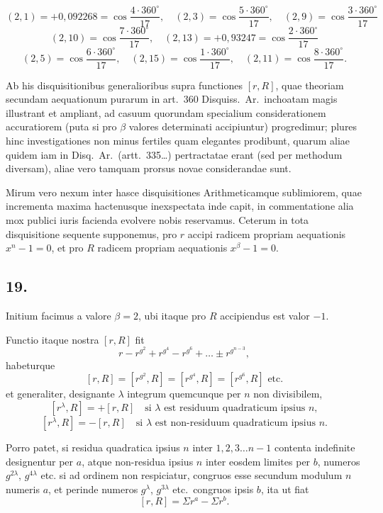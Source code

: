\documentclass[12pt,a4paper]{article}
\begin{document}
\[
(2,1) = +0{,}092268 = \cos\frac{4\cdot 360^\circ}{17}, \quad (2,3) = \cos\frac{5\cdot 360^\circ}{17}, \quad (2,9) = \cos\frac{3\cdot 360^\circ}{17}
\]
\[
(2,10) = \cos\frac{7\cdot 360^\circ}{17}, \quad (2,13) = +0{,}93247 = \cos\frac{2\cdot 360^\circ}{17}
\]
\[
(2,5) = \cos\frac{6\cdot 360^\circ}{17}, \quad (2,15) = \cos\frac{1\cdot 360^\circ}{17}, \quad (2,11) = \cos\frac{8\cdot 360^\circ}{17}.
\]

Ab his disquisitionibus generalioribus supra functiones $[r,R]$, quae theoriam secundam aequationum purarum in art.\ 360 Disquiss.\ Ar.\ inchoatam magis illustrant et ampliant, ad casuum quorundam specialium considerationem accuratiorem (puta si pro $\beta$ valores determinati accipiuntur) progredimur; plures hinc investigationes non minus fertiles quam elegantes prodibunt, quarum aliae quidem iam in Disq.\ Ar.\ (artt.\ 335\ldots) pertractatae erant (sed per methodum diversam), aliae vero tamquam prorsus novae considerandae sunt.

Mirum vero nexum inter hasce disquisitiones Arithmeticamque sublimiorem, quae incrementa maxima hactenusque inexspectata inde capit, in commentatione alia mox publici iuris facienda evolvere nobis reservamus. Ceterum in tota disquisitione sequente supponemus, pro $r$ accipi radicem propriam aequationis $x^n-1=0$, et pro $R$ radicem propriam aequationis $x^\beta-1=0$.

\subsection*{19.}

Initium facimus a valore $\beta=2$, ubi itaque pro $R$ accipiendus est valor $-1$.

Functio itaque nostra $[r,R]$ fit
\[
r - r^{g^2} + r^{g^4} - r^{g^6} + \ldots \pm r^{g^{n-3}},
\]
habeturque
\[
[r,R] = [r^{g^2}, R] = [r^{g^4}, R] = [r^{g^6}, R] \text{ etc.}
\]
et generaliter, designante $\lambda$ integrum quemcunque per $n$ non divisibilem,
\[
[r^\lambda, R] = +[r,R] \quad\text{si } \lambda \text{ est residuum quadraticum ipsius } n,
\]
\[
[r^\lambda, R] = -[r,R] \quad\text{si } \lambda \text{ est non-residuum quadraticum ipsius } n.
\]

Porro patet, si residua quadratica ipsius $n$ inter $1, 2, 3\ldots n-1$ contenta indefinite designentur per $a$, atque non-residua ipsius $n$ inter eosdem limites per $b$, numeros $g^{2\lambda}$, $g^{4\lambda}$ etc. si ad ordinem non respiciatur, congruos esse secundum modulum $n$ numeris $a$, et perinde numeros $g^{\lambda}$, $g^{3\lambda}$ etc.\ congruos ipsis $b$, ita ut fiat
\[
[r,R] = \Sigma r^a - \Sigma r^b.
\]
\end{document}

